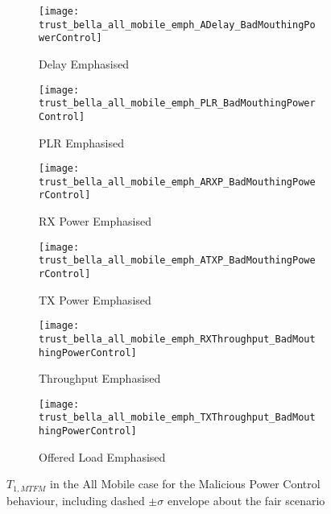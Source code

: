 \begin{figure}[h]
	\centering
	\begin{subfigure}{0.45\textwidth}
		\texttt{[image: trust\_bella\_all\_mobile\_emph\_ADelay\_BadMouthingPowerControl]} 
		\caption{Delay Emphasised}
		\label{fig:all_mobile_badmouthing_delay}
	\end{subfigure}
	\begin{subfigure}{0.45\textwidth}
		\texttt{[image: trust\_bella\_all\_mobile\_emph\_PLR\_BadMouthingPowerControl]} 
		\caption{PLR Emphasised}
		\label{fig:all_mobile_badmouthing_plr}
	\end{subfigure}
	
	\begin{subfigure}{0.45\textwidth}
		\texttt{[image: trust\_bella\_all\_mobile\_emph\_ARXP\_BadMouthingPowerControl]} 
		\caption{RX Power Emphasised}
		\label{fig:all_mobile_badmouthing_rxp}
	\end{subfigure}	
	\begin{subfigure}{0.45\textwidth}
		\texttt{[image: trust\_bella\_all\_mobile\_emph\_ATXP\_BadMouthingPowerControl]} 
		\caption{TX Power Emphasised}
		\label{fig:all_mobile_badmouthing_txp}
	\end{subfigure}
	
	\begin{subfigure}{0.45\textwidth}
		\texttt{[image: trust\_bella\_all\_mobile\_emph\_RXThroughput\_BadMouthingPowerControl]} 
		\caption{Throughput Emphasised}
		\label{fig:all_mobile_badmouthing_rxthroughput}
	\end{subfigure}
	\begin{subfigure}{0.45\textwidth}
		\texttt{[image: trust\_bella\_all\_mobile\_emph\_TXThroughput\_BadMouthingPowerControl]} 
		\caption{Offered Load Emphasised}
		\label{fig:all_mobile_badmouthing_txthroughput}
	\end{subfigure}
	\caption{$T_{1,MTFM}$ in the All Mobile case for the Malicious Power Control behaviour, including dashed $\pm\sigma$ envelope about the fair scenario}
	\label{fig:all_mobile_badmouthing}
\end{figure}
%
